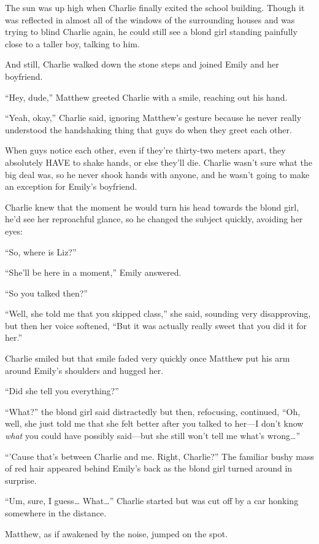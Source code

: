 The sun was up high when Charlie finally exited the school building. Though it was reflected in almost all of the windows of the surrounding houses and was trying to blind Charlie again, he could still see a blond girl standing painfully close to a taller boy, talking to him.

And still, Charlie walked down the stone steps and joined Emily and her boyfriend.

“Hey, dude,” Matthew greeted Charlie with a smile, reaching out his hand.

“Yeah, okay,” Charlie said, ignoring Matthew's gesture because he never really understood the handshaking thing that guys do when they greet each other.

When guys notice each other, even if they're thirty-two meters apart, they absolutely HAVE to shake hands, or else they'll die. Charlie wasn't sure what the big deal was, so he never shook hands with anyone, and he wasn't going to make an exception for Emily's boyfriend.

Charlie knew that the moment he would turn his head towards the blond girl, he'd see her reproachful glance, so he changed the subject quickly, avoiding her eyes:

“So, where is Liz?”

“She'll be here in a moment,” Emily answered.

“So you talked then?”

“Well, she told me that you skipped class,” she said, sounding very disapproving, but then her voice softened, “But it was actually really sweet that you did it for her.”

Charlie smiled but that smile faded very quickly once Matthew put his arm around Emily's shoulders and hugged her.

“Did she tell you everything?”

“What?” the blond girl said distractedly but then, refocusing, continued, “Oh, well, she just told me that she felt better after you talked to her—I don't know \textit{what} you could have possibly said—but she still won't tell me what's wrong…”

“'Cause that's between Charlie and me. Right, Charlie?” The familiar bushy mass of red hair appeared behind Emily's back as the blond girl turned around in surprise.

“Um, sure, I guess… What…” Charlie started but was cut off by a car honking somewhere in the distance.

Matthew, as if awakened by the noise, jumped on the spot.


